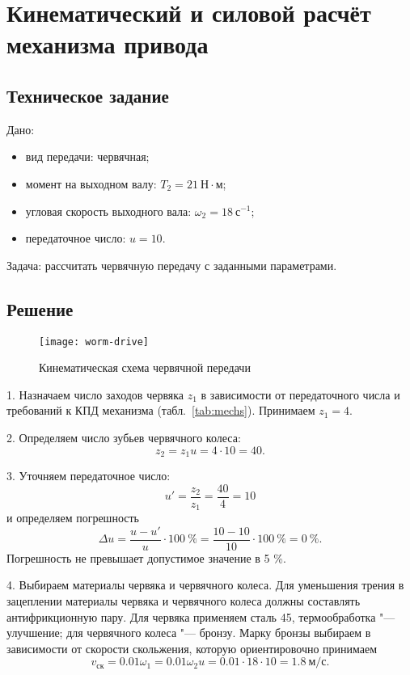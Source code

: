 \chapter{Кинематический и силовой расчёт механизма привода}

\section{Техническое задание}

Дано:
\begin{itemize}
    \item вид передачи: червячная;
    \item момент на выходном валу: $T_2 = 21~Н \cdot м$;
    \item угловая скорость выходного вала: $\omega_2 = 18~с^{-1}$;
    \item передаточное число: $u = 10$.
\end{itemize}

Задача: рассчитать червячную передачу с заданными параметрами.

\section{Решение}
\begin{wrapfigure}{l}{0.35\textwidth}
    \begin{center}
        \texttt{[image: worm-drive]}
        \caption{Кинематическая схема червячной передачи}
        \label{fig:worm-drive}
    \end{center}
\end{wrapfigure}

1. Назначаем число заходов червяка $z_1$ в зависимости от передаточного числа и требований к КПД механизма (табл.~\ref{tab:mechs}). Принимаем $z_1 = 4$.

2. Определяем число зубьев червячного колеса:
\[
    z_2 = z_1 u = 4 \cdot 10 = 40.
\]

3. Уточняем передаточное число:
\[
    u' = \frac{z_2}{z_1} = \frac{40}{4} = 10
\]
и определяем погрешность
\[
    \Delta u = \frac{u - u'}{u} \cdot 100~\%
             = \frac{10 - 10}{10} \cdot 100~\%
             = 0~\%.
\]
Погрешность не превышает допустимое значение в 5 \%.

4. Выбираем материалы червяка и червячного колеса.
Для уменьшения трения в зацеплении материалы червяка и червячного колеса должны составлять антифрикционную пару.
Для червяка применяем сталь 45, термообработка "--- улучшение; для червячного колеса "--- бронзу.
Марку бронзы выбираем в зависимости от скорости скольжения, которую ориентировочно принимаем
\[
    v_\text{ск} = 0.01 \omega_1 = 0.01 \omega_2 u = 0.01 \cdot 18 \cdot 10 = 1.8~м/с.
\]

